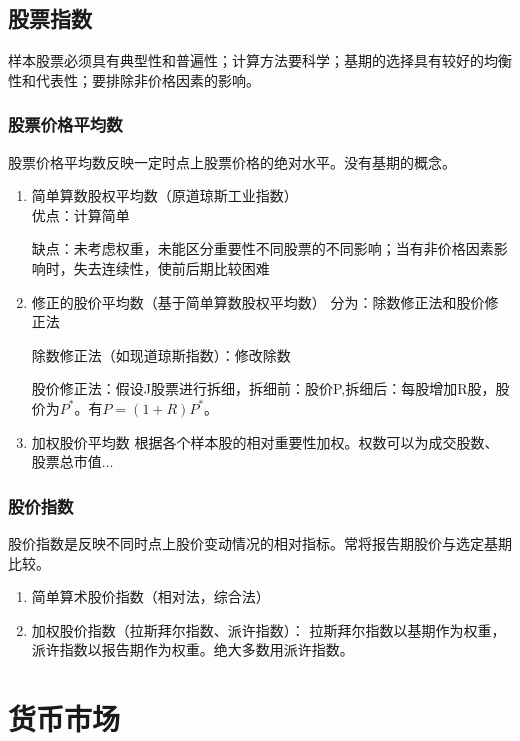 \documentclass{article}
\begin{document}
\subsection*{股票指数}
样本股票必须具有典型性和普遍性；计算方法要科学；基期的选择具有较好的均衡性和代表性；要排除非价格因素的影响。
\subsubsection*{股票价格平均数}
股票价格平均数反映一定时点上股票价格的绝对水平。没有基期的概念。
\begin{enumerate}
    \item 简单算数股权平均数（原道琼斯工业指数）\\
    优点：计算简单
    
    缺点：未考虑权重，未能区分重要性不同股票的不同影响；当有非价格因素影响时，失去连续性，使前后期比较困难
    \item 修正的股价平均数（基于简单算数股权平均数）
    分为：除数修正法和股价修正法

    除数修正法（如现道琼斯指数）：修改除数

    股价修正法：假设J股票进行拆细，拆细前：股价P,拆细后：每股增加R股，股价为$P^*$。有$P=(1+R)P^*$。
    \item 加权股价平均数
    根据各个样本股的相对重要性加权。权数可以为成交股数、股票总市值$\ldots $
\end{enumerate}
\subsubsection*{股价指数}
股价指数是反映不同时点上股价变动情况的相对指标。常将报告期股价与选定基期比较。
\begin{enumerate}
    \item 简单算术股价指数（相对法，综合法）
    \item 加权股价指数（拉斯拜尔指数、派许指数）：
    拉斯拜尔指数以基期作为权重，派许指数以报告期作为权重。绝大多数用派许指数。
\end{enumerate}



\clearpage
\section*{\center\Huge 货币市场}
\end{document}
